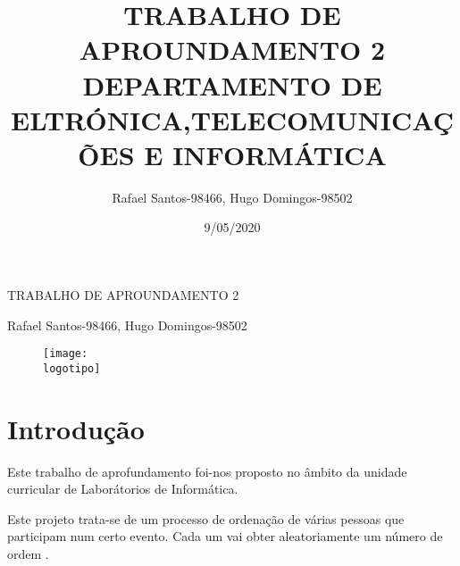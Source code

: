 \documentclass{report}
\begin{document}
%
\def\titulo{TRABALHO DE APROUNDAMENTO 2}
\def\data{9/05/2020}
\def\autores{Rafael Santos-98466, Hugo Domingos-98502}
\def\autorescontactos{}
\def\versao{}
\def\departamento{DEPARTAMENTO DE ELTRÓNICA,TELECOMUNICAÇÕES E INFORMÁTICA}
\def\empresa{}
\def\logotipo{download.jpeg}
%
%
\begin{titlepage}

\begin{center}
%
\vspace*{50mm}
%
{\Huge \titulo}\\ 
%
\vspace{10mm}
%

%
\vspace{10mm}
%
{\LARGE \autores}\\ 
%
\vspace{30mm}
%
\begin{figure}[h]
\center
\texttt{[image: \\logotipo]}
\end{figure}
%
\vspace{30mm}
\end{center}
%
\begin{flushright}
\versao
\end{flushright}
\end{titlepage}

\title{%
{\Huge\textbf{\titulo}}\\
{\Large \departamento\\ \empresa}
}
%
\author{%
    \autores \\
    \autorescontactos
}
%
\date{\data}
%
\maketitle


\tableofcontents


\clearpage
{}

\chapter{Introdução}
\label{chap.introducao}

Este trabalho de aprofundamento foi-nos proposto no âmbito da unidade curricular de Laborátorios de Informática.

Este projeto trata-se de um processo de ordenação de várias pessoas que participam num certo evento. Cada um vai obter aleatoriamente um número de ordem .
\end{document}
